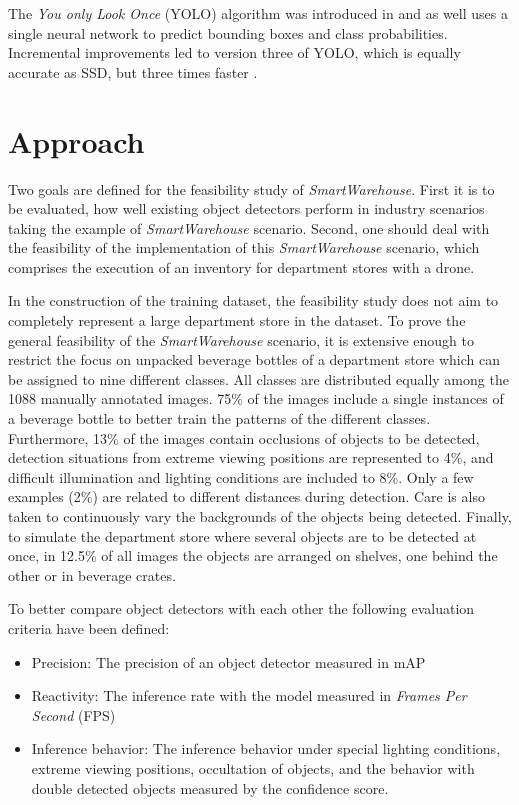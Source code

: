 \documentclass[a4paper, 10pt, journal]{wissarbIEEE}      %
\begin{document}
The \textit{You only Look Once} (YOLO) algorithm was introduced in \cite{JosephRedmonSantoshDivvalaRossGirshickAliFarhadi.2016} and as well uses a single neural network to predict bounding boxes and class probabilities. Incremental improvements led to version three of YOLO, which is equally accurate as SSD, but three times faster \cite{JosephRedmon.2018}. 

\section{Approach} \label{approach}

Two goals are defined for the feasibility study of \textit{SmartWarehouse}. First it is to be evaluated, how well existing object detectors perform in industry scenarios taking the example of \textit{SmartWarehouse} scenario. Second, one should deal with the feasibility of the implementation of this \textit{SmartWarehouse} scenario, which comprises the execution of an inventory for department stores with a drone. 

In the construction of the training dataset, the feasibility study does not aim to completely represent a large department store in the dataset. To prove the general feasibility of the \textit{SmartWarehouse} scenario, it is extensive enough to restrict the focus on unpacked beverage bottles of a department store which can be assigned to nine different classes. All classes are distributed equally among the 1088 manually annotated images. 75\% of the images include a single instances of a beverage bottle to better train the patterns of the different classes. Furthermore, 13\% of the images contain occlusions of objects to be detected, detection situations from extreme viewing positions are represented to 4\%, and difficult illumination and lighting conditions are included to 8\%. Only a few examples (2\%) are related to different distances during detection. Care is also taken to continuously vary the backgrounds of the objects being detected. Finally, to simulate the department store where several objects are to be detected at once, in 12.5\% of all images the objects are arranged on shelves, one behind the other or in beverage crates. 

To better compare object detectors with each other the following evaluation criteria have been defined:

\begin{itemize}
	\item Precision: The precision of an object detector measured in mAP
	\item Reactivity: The inference rate with the model measured in \textit{Frames Per Second} (FPS)
	\item Inference behavior: The inference behavior under special lighting conditions, extreme viewing positions, occultation of objects, and the behavior with double detected objects measured by the confidence score. 
\end{itemize}
\end{document}
